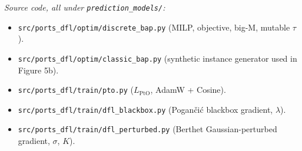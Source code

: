 \documentclass[11pt]{article}
\begin{document}
\noindent\textit{Source code, all under \texttt{prediction\_models/}:}

\begin{itemize}\setlength{\itemsep}{0pt}\small
  \item \texttt{src/ports\_dfl/optim/discrete\_bap.py} \;(MILP, objective, big-M, mutable $\tau$).
  \item \texttt{src/ports\_dfl/optim/classic\_bap.py} \;(synthetic instance generator used in Figure 5b).
  \item \texttt{src/ports\_dfl/train/pto.py} \;($L_{\mathrm{PtO}}$, AdamW + Cosine).
  \item \texttt{src/ports\_dfl/train/dfl\_blackbox.py} \;(Pogan\v{c}i\'c blackbox gradient, $\lambda$).
  \item \texttt{src/ports\_dfl/train/dfl\_perturbed.py} \;(Berthet Gaussian-perturbed gradient, $\sigma$, $K$).
\end{itemize}
\end{document}
